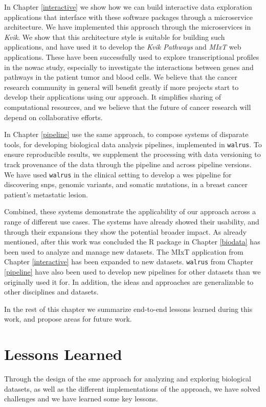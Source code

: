 In Chapter \ref{interactive} we show how we can build interactive data
exploration applications that interface with these software packages through a
microservice architecture. We have implemented this approach through the
microservices in \emph{Kvik}. We show that this architecture style is suitable
for building such applications, and have used it to develop the \emph{Kvik
Pathways} and \emph{MIxT} web applications. These have been successfully used to
explore transcriptional profiles in the \gls{nowac} study, especially to
investigate the interactions between genes and pathways in the patient tumor and
blood cells.  We believe that the cancer research community in general will
benefit greatly if more projects start to develop their applications using our
approach. It simplifies sharing of computational resources, and we believe that
the future of cancer research will depend on collaborative efforts. 

In Chapter
\ref{pipeline} use the same approach, to compose systems of disparate tools, for
developing biological data analysis pipelines, implemented in \texttt{walrus}.
To ensure reproducible results, we supplement the processing with data
versioning to track provenance of the data through the pipeline and across
pipeline versions. We have used \texttt{walrus} in the clinical setting to
develop a \gls{wes} pipeline for discovering \glspl{snp}, genomic variants, and
somatic mutations, in a breast cancer patient's metastatic lesion. 

Combined, these systems demonstrate the applicability of our approach across a
range of different use cases. The systems have already showed their usability,
and through their expansions they show the potential broader impact. As
already mentioned, after this work was concluded the R package in Chapter
\ref{biodata} has been used to analyze and manage new datasets. The MIxT
application from Chapter \ref{interactive} has been expanded to new datasets.
\texttt{walrus} from Chapter \ref{pipeline} have also been used to develop new
pipelines for other datasets than we originally used it for. In addition, the
ideas and approaches are generalizable to other disciplines and datasets. 

In the rest of this chapter we summarize end-to-end lessons learned during this
work, and propose areas for future work.

\section{Lessons Learned}
Through the design of the \gls{sme} approach for analyzing and exploring
biological datasets, as well as the different implementations of the approach,
we have solved challenges and we have learned some key lessons.


